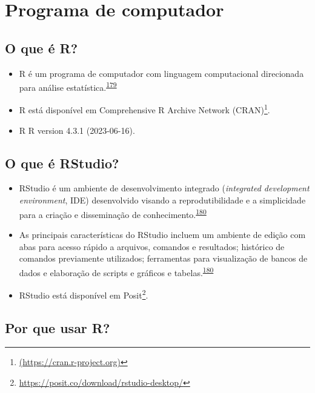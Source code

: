 \documentclass[
  a4paper,
]{book}
\renewcommand{\href}[2]{#2\footnote{\url{#1}}}
\begin{document}
\hypertarget{inicio}{%
\section{Programa de computador}\label{inicio}}

\hypertarget{o-que-uxe9-r}{%
\subsection{O que é R?}\label{o-que-uxe9-r}}

\begin{itemize}
\item
  R é um programa de computador com linguagem computacional direcionada para análise estatística.\textsuperscript{\protect\hyperlink{ref-ihaka1996}{179}}
\item
  R está disponível em \href{(https://cran.r-project.org)}{Comprehensive R Archive Network (CRAN)}.
\item
  R R version 4.3.1 (2023-06-16).
\end{itemize}

\hypertarget{o-que-uxe9-rstudio}{%
\subsection{O que é RStudio?}\label{o-que-uxe9-rstudio}}

\begin{itemize}
\item
  RStudio é um ambiente de desenvolvimento integrado (\emph{integrated development environment}, IDE) desenvolvido visando a reprodutibilidade e a simplicidade para a criação e disseminação de conhecimento.\textsuperscript{\protect\hyperlink{ref-racine2011}{180}}
\item
  As principais características do RStudio incluem um ambiente de edição com abas para acesso rápido a arquivos, comandos e resultados; histórico de comandos previamente utilizados; ferramentas para visualização de bancos de dados e elaboração de scripts e gráficos e tabelas.\textsuperscript{\protect\hyperlink{ref-racine2011}{180}}
\item
  RStudio está disponível em \href{https://posit.co/download/rstudio-desktop/}{Posit}.
\end{itemize}

\hypertarget{por-que-usar-r}{%
\subsection{Por que usar R?}\label{por-que-usar-r}}
\end{document}
